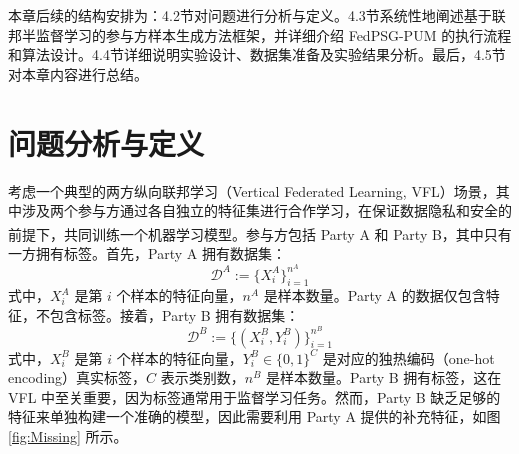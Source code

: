 本章后续的结构安排为：4.2节对问题进行分析与定义。4.3节系统性地阐述基于联邦半监督学习的参与方样本生成方法框架，并详细介绍  FedPSG-PUM  的执行流程和算法设计。4.4节详细说明实验设计、数据集准备及实验结果分析。最后，4.5节对本章内容进行总结。

\section{问题分析与定义}
考虑一个典型的两方纵向联邦学习（Vertical Federated Learning, VFL）场景，其中涉及两个参与方通过各自独立的特征集进行合作学习，在保证数据隐私和安全的前提下，共同训练一个机器学习模型\textsuperscript{\cite{yang2019federated}}。参与方包括 Party A 和 Party B，其中只有一方拥有标签。首先，Party A 拥有数据集：
\begin{equation}
	\mathcal{D}^A := \{X^A_i\}_{i=1}^{n^A}
\end{equation}
式中，$X^A_i$ 是第 $i$ 个样本的特征向量，$n^A$ 是样本数量。Party A 的数据仅包含特征，不包含标签。接着，Party B 拥有数据集：
\begin{equation}
	\mathcal{D}^B := \{(X^B_i, Y^B_i)\}_{i=1}^{n^B}
\end{equation}
式中，$X^B_i$ 是第 $i$ 个样本的特征向量，$Y^B_i \in \{0,1\}^C$ 是对应的独热编码（one-hot encoding）真实标签，$C$ 表示类别数，$n^B$ 是样本数量。Party B 拥有标签，这在 VFL 中至关重要，因为标签通常用于监督学习任务。然而，Party B 缺乏足够的特征来单独构建一个准确的模型，因此需要利用 Party A 提供的补充特征，如图 \ref{fig:Missing} 所示。

